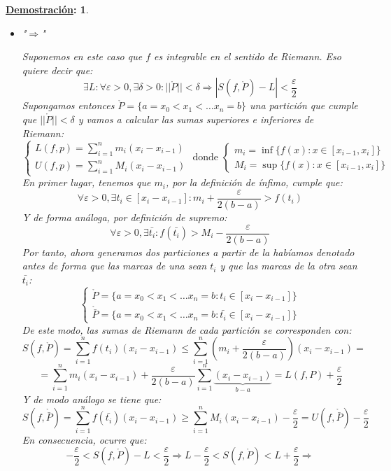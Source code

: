 \documentclass[10pt,a4paper,openright]{book}
\theoremstyle{break}
\newtheorem*{demo}{\underline{Demostración}:}
\begin{document}
\begin{demo}
\begin{itemize}
\item "$\Rightarrow$"

Suponemos en este caso que $f$ es integrable en el sentido de Riemann. Eso quiere decir que:
$$\exists L: \forall \varepsilon > 0, \exists \delta > 0 : ||\mathring{P}|| < \delta \Rightarrow |S(f, \mathring{P}) - L| < \frac{\varepsilon}{2}$$
Supongamos entonces $\mathring{P}= \{ a = x_0 < x_1 < \ldots  x_n = b\}$ una partición que cumple que $||\mathring{P}||<\delta$ y vamos a calcular las sumas superiores e inferiores de Riemann:
$$\begin{cases} L(f, p) = \displaystyle \sum_{i=1}^{n} m_i (x_i - x_{i-1})  \\ U(f, p) = \displaystyle \sum_{i=1}^{n} M_i (x_i - x_{i-1}) \end{cases} \mbox{ donde }	\begin{cases} m_i = \inf \{f(x): x\in [x_{i-1}, x_i]\} \\ M_i = \sup \{f(x): x\in [x_{i-1}, x_i]\} \end{cases}$$
En primer lugar, tenemos que $m_i$, por la definición de ínfimo, cumple que:
$$\forall \varepsilon > 0, \exists t_i \in [x_i - x_{i-1}]: m_i + \frac{\varepsilon}{2(b-a)} > f(t_i)$$
Y de forma análoga, por definición de supremo:
$$\forall \varepsilon > 0, \exists \bar{t_i}: f(\bar{t_i}) > M_i - \frac{\varepsilon}{2(b-a)}$$
Por tanto, ahora generamos dos particiones a partir de la habíamos denotado antes de forma que las marcas de una sean $t_i$ y que las marcas de la otra sean $\bar{t_i}$:
$$\begin{cases} \mathring{P} =\{ a = x_0 < x_1 < \ldots  x_n = b : t_i \in [x_i - x_{i-1}] \} \\ \mathring{\bar{P}} =\{ a = x_0 < x_1 < \ldots  x_n = b : \bar{t_i} \in [x_i - x_{i-1}] \} \end{cases}$$
De este modo, las sumas de Riemann de cada partición se corresponden con:
$$ S(f, \mathring{P}) = \sum_{i=1}^{n} f(t_i) (x_i - x_{i-1}) \leq \sum_{i=1}^{n} \left(m_i + \frac{\varepsilon}{2(b-a)}\right) (x_i - x_{i-1}) =$$
$$= \sum_{i=1}^{n} m_i (x_i - x_{i-1}) + \frac{\varepsilon}{2(b-a)} \sum_{i=1}^{n} \underbrace{(x_i - x_{i-1})}_{b-a} = L(f, P) + \frac{\varepsilon}{2}$$
Y de modo análogo se tiene que:
$$ S(f, \mathring{\bar{P}}) = \sum_{i=1}^{n} f(\bar{t_i}) (x_i - x_{i-1}) \geq \sum_{i=1}^{n} M_i (x_i - x_{i-1}) - \frac{\varepsilon}{2} = U(f,\mathring{\bar{P}})- \frac{\varepsilon}{2}$$
En consecuencia, ocurre que:
$$-\frac{\varepsilon}{2} < S(f, \mathring{P}) - L < \frac{\varepsilon}{2} \Rightarrow L-\frac{\varepsilon}{2} < S(f, \mathring{P}) < L+\frac{\varepsilon}{2} \Rightarrow $$

\end{itemize}
\end{demo}
\end{document}
